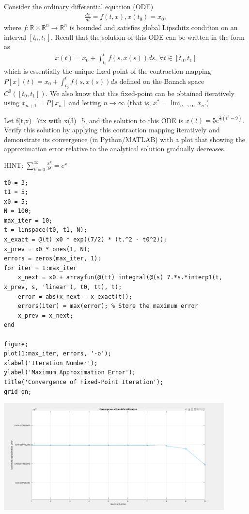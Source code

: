 \begin{problem}[20]
    Consider the ordinary differential equation (ODE)
    \begin{align*}
        \frac{dx}{dt}=f(t,x), x(t_0) = x_0,
    \end{align*}
    where $f:\mathbb{R}\times \mathbb{R}^n\rightarrow\mathbb{R}^n$ is bounded and satisfies global Lipschitz condition on an interval $[t_0,t_1]$. Recall that the solution of this ODE can be written in the form as
    \begin{align*}
        x(t) = x_0 + \int_{t_0}^{t} f(s,x(s)) ds,\, \forall t\in[t_0,t_1]
    \end{align*}
    which is essentially the unique fixed-point of the contraction mapping $P[x](t) = x_0 + \int_{t_0}^{t} f(s,x(s)) ds$ defined on the Banach space $C^0([t_0,t_1])$. We also know that this fixed-point can be obtained iteratively using $x_{n+1} = P[x_{n}]$ and letting $n\rightarrow \infty$ (that is, $x^* = \lim_{n\rightarrow\infty} x_n$.)
    
    Let f(t,x)=7tx with x(3)=5, and the solution to this ODE is $x(t)=5 e^{\frac{7}{2}(t^2-9)}$. Verify this solution by applying this contraction mapping iteratively and demonstrate its convergence (in Python/MATLAB) with a plot that showing the approximation error relative to the analytical solution gradually decreases.

    HINT: $\sum_{k=0}^{\infty} \frac{x^k}{k!} = e^x$
    \end{problem}
\begin{answer}
    \begin{lstlisting}
t0 = 3;
t1 = 5;
x0 = 5; 
N = 100; 
max_iter = 10; 
t = linspace(t0, t1, N);
x_exact = @(t) x0 * exp((7/2) * (t.^2 - t0^2));
x_prev = x0 * ones(1, N);
errors = zeros(max_iter, 1);
for iter = 1:max_iter
    x_next = x0 + arrayfun(@(tt) integral(@(s) 7.*s.*interp1(t, x_prev, s, 'linear'), t0, tt), t);
    error = abs(x_next - x_exact(t));
    errors(iter) = max(error); % Store the maximum error
    x_prev = x_next;
end

figure;
plot(1:max_iter, errors, '-o');
xlabel('Iteration Number');
ylabel('Maximum Approximation Error');
title('Convergence of Fixed-Point Iteration');
grid on;
    \end{lstlisting}
    \begin{center}
        \includegraphics[width=0.9\textwidth]{esterr.png}
    \end{center}
\end{answer}

